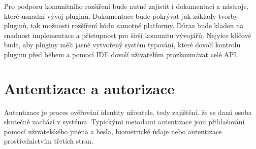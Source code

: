 Pro podporu komunitního rozšíření bude nutné zajistit i dokumentaci a nástroje, které usnadní vývoj pluginů. 
Dokumentace bude pokrývat jak základy tvorby pluginů, tak možnosti rozšíření kódu samotné platformy. 
Důraz bude kladen na snadnost implementace a přístupnost pro širší komunitu vývojářů.
Nejvíce klíčové bude, aby pluginy měli jasně vytvořený systém typování, které dovolí kontrolu pluginu před během a pomocí IDE dovolí uživatelům prozkoumávat celé API.


    
    
    


\section{Autentizace a autorizace}\label{text:navrh/auth}

Autentizace je proces ověřování identity uživatele, tedy zajištění, že se daná osoba skutečně nachází v systému. 
Typickými metodami autentizace jsou přihlašování pomocí uživatelského jména a hesla, biometrické údaje nebo autentizace prostřednictvím třetích stran.

